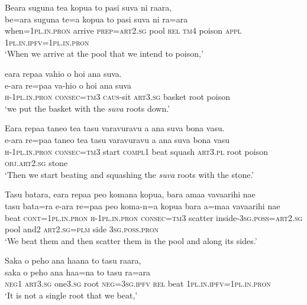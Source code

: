 \ea\label{ex:text30-11}
Beara suguna tea kopua to pasi suva ni raara,\\
\gll be=ara	suguna	te=a	kopua	to	pasi	suva	ni	ra=ara\\
     when=1\textsc{pl}.\textsc{in}.\textsc{pron}	arrive	\textsc{prep}=\textsc{art}2.\textsc{sg}	pool	\textsc{rel}	\textsc{tm}4	poison	\textsc{appl}	1\textsc{pl}.\textsc{in}.\textsc{ipfv}=1\textsc{pl}.\textsc{in}.\textsc{pron}\\
\glt `When we arrive at the pool that we intend to poison,'
\z

\ea\label{ex:text30-12}
eara repaa vahio o hoi ana suva.\\
\gll e-ara	re=paa	va-hio	o	hoi	ana	suva\\
     \textsc{h}-1\textsc{pl}.\textsc{in}.\textsc{pron}	\textsc{consec}=\textsc{tm}3	\textsc{caus}-sit	\textsc{art}3.\textsc{sg}	basket	root	poison\\
\glt `we put the basket with the \textit{suva} roots down.'
\z

\ea\label{ex:text30-13}
Eara repaa taneo tea tasu varavuravu a ana suva bona vasu.\\
\gll e-ara	re=paa	taneo	tea	tasu	varavuravu	a	ana	suva	bona	vasu\\
     \textsc{h}-1\textsc{pl}.\textsc{in}.\textsc{pron}	\textsc{consec}=\textsc{tm}3	start	\textsc{compl}1	beat	squash	\textsc{art}3.\textsc{pl}	root	poison	\textsc{obj}.\textsc{art}2.\textsc{sg}	stone\\
\glt `Then we start beating and squashing the \textit{suva} roots with the stone.'
\z

\ea\label{ex:text30-14}
Tasu batara, eara repaa peo komana kopua, bara amaa vavaarihi nae\\
\gll tasu	bata=ra	e-ara	re=paa	peo	koma-n=a	kopua	bara	a=maa	vavaarihi	nae\\
     beat	\textsc{cont}=1\textsc{pl}.\textsc{in}.\textsc{pron}	\textsc{h}-1\textsc{pl}.\textsc{in}.\textsc{pron}	\textsc{consec}=\textsc{tm}3	scatter	inside-3\textsc{sg}.\textsc{poss}=\textsc{art}2.\textsc{sg}	pool	and2	\textsc{art}2.\textsc{sg}=\textsc{plm}	side	3\textsc{sg}.\textsc{poss}.\textsc{pron}\\
\glt `We beat them and then scatter them in the pool and along its sides.'
\z

\ea\label{ex:text30-15}
Saka o peho ana haana to tasu raara,\\
\gll saka	o	peho	ana	haa=na	to	tasu	ra=ara\\
     \textsc{neg}1	\textsc{art}3.\textsc{sg}	one3.\textsc{sg}	root	\textsc{neg}=3\textsc{sg}.\textsc{ipfv}	\textsc{rel}	beat	1\textsc{pl}.\textsc{in}.\textsc{ipfv}=1\textsc{pl}.\textsc{in}.\textsc{pron}\\
\glt `It is not a single root that we beat,'
\z

